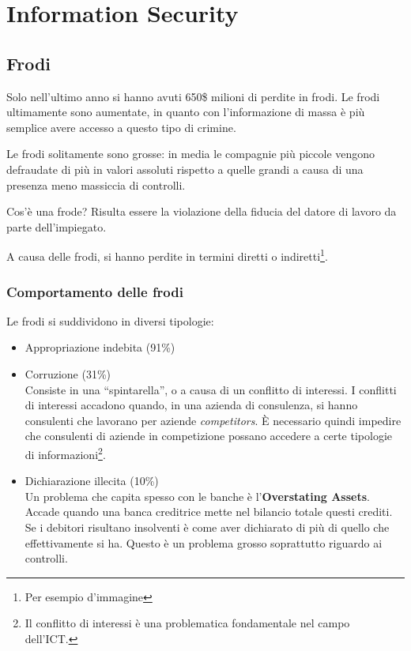 \part{Information Security}

\chapter{Frodi}
\label{Frodi}

Solo nell'ultimo anno si hanno avuti 650\$ milioni di perdite in frodi. Le frodi
ultimamente sono aumentate, in quanto con l'informazione di massa è più
semplice avere accesso a questo tipo di crimine.

Le frodi solitamente sono grosse: in media le compagnie più piccole vengono
defraudate di più in valori assoluti rispetto a quelle grandi a causa di una presenza
meno massiccia di controlli.

Cos'è una frode? Risulta essere la violazione della fiducia del
datore di lavoro da parte dell'impiegato.

A causa delle frodi, si hanno perdite in termini diretti o 
indiretti\footnote{Per esempio d'immagine}.

\section{Comportamento delle frodi}

Le frodi si suddividono in diversi tipologie:

\begin{itemize}
  \item Appropriazione indebita (91\%)
  \item Corruzione (31\%) \\
  Consiste in una ``spintarella'', o a causa di un conflitto di interessi. I
  conflitti di interessi accadono quando, in una azienda di consulenza, si
  hanno consulenti che lavorano per aziende \textit{competitors}. È necessario
  quindi impedire che consulenti di aziende in competizione possano accedere a
  certe tipologie di informazioni\footnote{Il conflitto di interessi è una
  problematica fondamentale nel campo dell'ICT.}.
  \item Dichiarazione illecita (10\%) \\
  Un problema che capita spesso con le banche è l'\textbf{Overstating Assets}.
  Accade quando una banca creditrice mette nel bilancio totale questi crediti.
  Se i debitori risultano insolventi è come aver dichiarato di più di quello
  che effettivamente si ha. Questo è un problema grosso soprattutto riguardo ai
  controlli.
\end{itemize}
